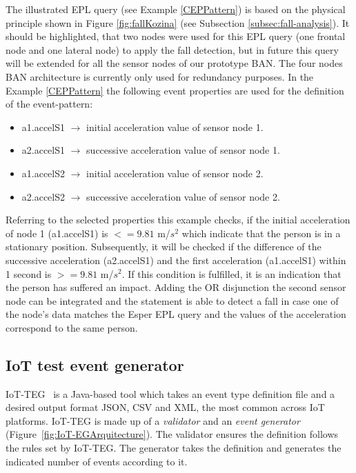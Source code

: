 \documentclass[10pt,journal,compsoc]{IEEEtran}
\begin{document}
The illustrated EPL query (see Example \ref{CEPPattern}) is based on the physical principle shown in Figure \ref{fig:fallKozina} (see Subsection \ref{subsec:fall-analysis}). It should be highlighted, that two nodes were used for this EPL query (one frontal node and one lateral node) to apply the fall detection, but in future this query will be extended for all the sensor nodes of our prototype BAN. The four nodes BAN architecture is currently only used for redundancy purposes. In the Example \ref{CEPPattern} the following event properties are used for the definition of the event-pattern:
\begin{itemize}
	\item a1.accelS1 $\rightarrow$ initial acceleration value of sensor node 1.
	\item a2.accelS1 $\rightarrow$ successive acceleration value of sensor node 1.
	\item a1.accelS2 $\rightarrow$ initial acceleration value of sensor node 2.
	\item a2.accelS2 $\rightarrow$ successive acceleration value of sensor node 2.
\end{itemize}
Referring to the selected properties this example checks, if the initial acceleration of node 1 (a1.accelS1) is $<= 9.81$ m/$s^2$ which indicate that the person is in a stationary position. Subsequently, it will be checked if the difference of the successive acceleration (a2.accelS1) and the first acceleration (a1.accelS1) within 1 second is $>= 9.81$ m/$s^2$. If this condition is fulfilled, it is an indication that the person has suffered an impact. Adding the OR disjunction the second sensor node can be integrated and the statement is able to detect a fall in case one of the node's data matches the Esper EPL query and the values of the acceleration correspond to the same person.

\subsection{IoT test event generator}
\label{iotteg}

IoT-TEG~\cite{Gutierrez2017,TesisGutierrez2017} is a Java-based tool which takes an event 
type definition file and a desired output format JSON, CSV and XML, the most common across IoT platforms. IoT-TEG is made up of a \emph{validator} and an \emph{event generator} 
(Figure~\ref{fig:IoT-EGArquitecture}). The validator ensures the definition follows the rules set 
by IoT-TEG. The generator takes the definition and generates the indicated number of events according to it.
\end{document}
